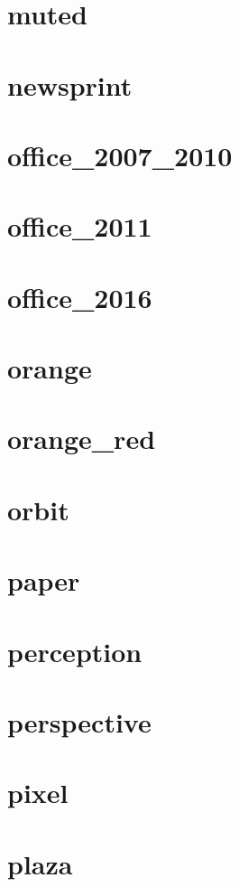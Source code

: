 \section{muted}
\newpage
\section{newsprint}
\newpage
\section{office\_2007\_2010}
\newpage
\section{office\_2011}
\newpage
\section{office\_2016}
\newpage
\section{orange}
\newpage
\section{orange\_red}
\newpage
\section{orbit}
\newpage
\section{paper}
\newpage
\section{perception}
\newpage
\section{perspective}
\newpage
\section{pixel}
\newpage
\section{plaza}
\newpage
